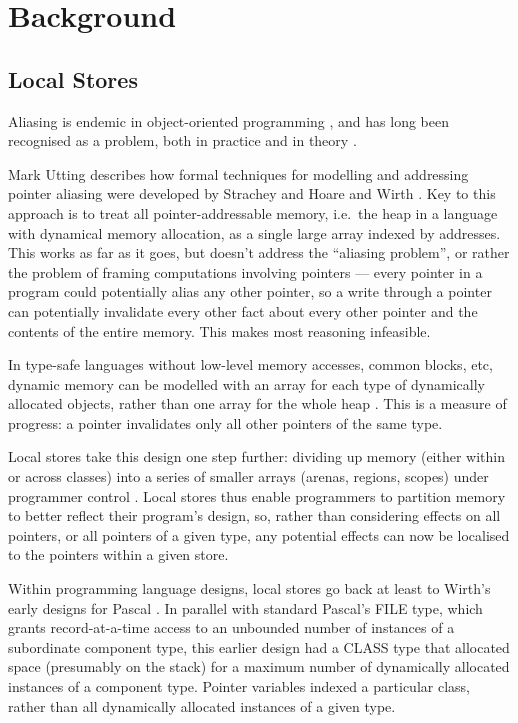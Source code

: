 \section{Background}

\subsection{Local Stores}

Aliasing is endemic in object-oriented programming
\cite{noble_flexible_1998}, and has long been recognised as a problem,
both in practice and in theory \cite{geneva91}.

Mark Utting \cite{utting1995} describes how formal techniques for
modelling and addressing pointer aliasing were developed by Strachey
\cite{strachey-varieties-book1997} and Hoare and Wirth
\cite{hoare-wirth-axiomatic-actainformatica1973}.  Key to this
approach is to treat all pointer-addressable memory, i.e.\ the heap in
a language with dynamical memory allocation, as a single large array
indexed by addresses. This works as far as it goes, but doesn't
address the ``aliasing problem'', or rather the problem of framing
computations involving pointers --- every pointer in a program could
potentially alias any other pointer, so a write through a pointer can
potentially invalidate every other fact about every other pointer and
the contents of the entire memory.  This makes most reasoning
infeasible.

In type-safe languages without low-level memory accesses, common
blocks, etc, dynamic memory can be modelled with an array for each
type of dynamically allocated objects, rather than one array for the
whole heap \cite{wirth-pldesign-ifip1974}. This is a measure of
progress: a pointer invalidates only all other pointers of the same
type.

Local stores take this design one step further: dividing up memory
(either within or across classes) into a series of smaller arrays
(arenas, regions, scopes) under programmer control \cite{utting1995}.
Local stores thus enable programmers to partition memory to better
reflect their program's design, so, rather than considering effects on
all pointers, or all pointers of a given type, any potential effects
can now be localised to the pointers within a given store.

Within programming language designs, local stores go back at least to
Wirth's early designs for Pascal \cite{wirth-pascal-1971}.  In
parallel with standard Pascal's FILE type, which grants
record-at-a-time access to an unbounded number of instances of a
subordinate component type, this earlier design had a CLASS type that
allocated space (presumably on the stack) for a maximum number of
dynamically allocated instances of a component type. Pointer variables
indexed a particular class, rather than all dynamically allocated
instances of a given type.


